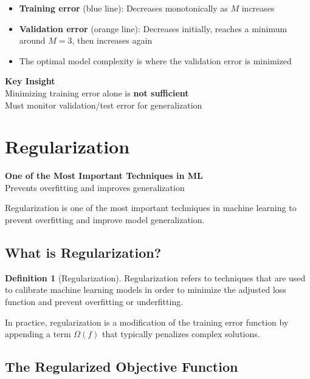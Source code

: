 \documentclass[11pt,a4paper]{article}
\theoremstyle{definition}
\newtheorem{definition}{Definition}[section]
\theoremstyle{plain}
\theoremstyle{remark}
\begin{document}
\begin{itemize}
    \item \textbf{Training error} (blue line): Decreases monotonically as $M$ increases
    \item \textbf{Validation error} (orange line): Decreases initially, reaches a minimum around $M = 3$, then increases again
    \item The optimal model complexity is where the validation error is minimized
\end{itemize}

\begin{center}
\colorbox{yellow!15}{\parbox{0.9\textwidth}{
\centering
\textbf{Key Insight}\\[0.2cm]
Minimizing training error alone is \textbf{not sufficient}\\[0.1cm]
Must monitor validation/test error for generalization
}}
\end{center}

\section{Regularization}

\begin{center}
\colorbox{green!15}{\parbox{0.85\textwidth}{
\centering
\textbf{One of the Most Important Techniques in ML}\\[0.1cm]
Prevents overfitting and improves generalization
}}
\end{center}

Regularization is one of the most important techniques in machine learning to prevent overfitting and improve model generalization.

\subsection{What is Regularization?}

\begin{definition}[Regularization]
Regularization refers to techniques that are used to calibrate machine learning models in order to minimize the adjusted loss function and prevent overfitting or underfitting.
\end{definition}

In practice, regularization is a modification of the training error function by appending a term $\Omega(f)$ that typically penalizes complex solutions.

\subsection{The Regularized Objective Function}
\end{document}
